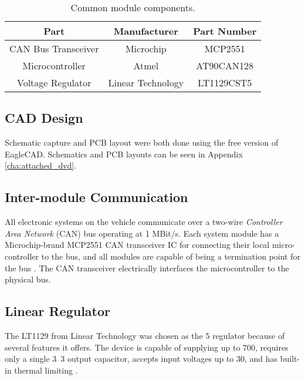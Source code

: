 \begin{table}[H]
	\caption{Common module components.}
	\label{tab:common_module_components}
	\centering
	\begin{tabular}{|c|c|c|}
		\hline 
		Part & Manufacturer & Part Number\tabularnewline 
		\hline \hline
		CAN Bus Transceiver & Microchip & MCP2551\tabularnewline \hline
		Microcontroller & Atmel & AT90CAN128\tabularnewline \hline
		Voltage Regulator & Linear Technology & LT1129CST5\tabularnewline		
		\hline
	\end{tabular}
\end{table}

\subsection{CAD Design}

Schematic capture and PCB layout were both done using the free version of EagleCAD. Schematics and PCB layouts can be seen in Appendix \ref{cha:attached_dvd}.


\subsection{Inter-module Communication\label{sec:inter_module_communication}}


All electronic systems on the vehicle communicate over a two-wire \emph{Controller Area Network} (CAN) bus operating at 1 MBit/s. Each system module has a Microchip-brand MCP2551 CAN transceiver IC for connecting their local micro-controller to the bus, and all modules are capable of being a termination point for the bus \cite{MCP2551}. The CAN transceiver electrically interfaces the microcontroller to the physical bus.

\subsection{Linear Regulator}

The LT1129 from Linear Technology was chosen as the \unit{5}{\volt} regulator because of several features it offers. The device is capable of supplying up to \unit{700}{\milli\ampere}, requires only a single \unit{3.3}{\micro\farad} output capacitor, accepts input voltages up to \unit{30}{\volt}, and has built-in thermal limiting \cite{LTC1129}.